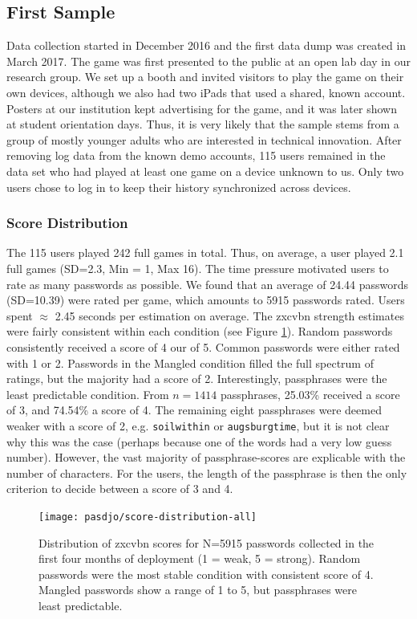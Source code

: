 \subsection{First Sample}
Data collection started in December 2016 and the first data dump was created in March 2017. The game was first presented to the public at an open lab day in our research group. We set up a booth and invited visitors to play the game on their own devices, although we also had two iPads that used a shared, known account. Posters at our institution kept advertising for the game, and it was later shown at student orientation days. Thus, it is very likely that the sample stems from a group of mostly younger adults who are interested in technical innovation. After removing log data from the known demo accounts, 115 users remained in the data set who had played at least one game on a device unknown to us. Only two users chose to log in to keep their history synchronized across devices. 

\subsubsection{Score Distribution}

The 115 users played 242 full games in total. Thus, on average, a user played 2.1 full games (SD=2.3, Min = 1, Max 16).
The time pressure motivated users to rate as many passwords as possible. We found that an average of 24.44 passwords (SD=10.39) were rated per game, which amounts to 5915 passwords rated. Users spent $\approx$ 2.45 seconds per estimation on average. The zxcvbn strength estimates were fairly consistent within each condition (see Figure \ref{fig:pasdjo:zxcvbn-score-distribution}). Random passwords consistently received a score of 4 our of 5. Common passwords were either rated with 1 or 2. Passwords in the Mangled condition filled the full spectrum of ratings, but the majority had a score of 2. Interestingly, passphrases were the least predictable condition. From $n = 1414$ passphrases, 25.03\% received a score of 3, and 74.54\% a score of 4. The remaining eight passphrases were deemed weaker with a score of 2, e.g. \texttt{soilwithin} or \texttt{augsburgtime}, but it is not clear why this was the case (perhaps because one of the words had a very low guess number). However, the vast majority of passphrase-scores are explicable with the number of characters. For the users, the length of the passphrase is then the only criterion to decide between a score of 3 and 4. 

\begin{figure}[htbp]
	\centering
	\texttt{[image: pasdjo/score-distribution-all]}
	\caption{\label{fig:pasdjo:zxcvbn-score-distribution} Distribution of zxcvbn scores for N=5915 passwords collected in the first four months of deployment (1 = weak, 5 = strong). Random passwords were the most stable condition with consistent score of 4. Mangled passwords show a range of 1 to 5, but passphrases were least predictable.}
\end{figure}

